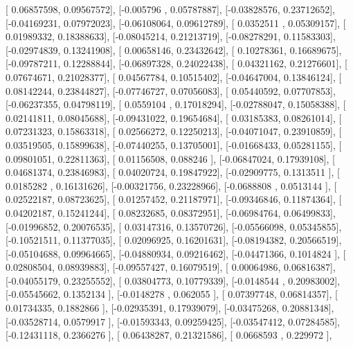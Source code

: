 \documentclass{article}
\begin{document}
       [ 0.06857598,  0.09567572],
       [-0.005796  ,  0.05787887],
       [-0.03828576,  0.23712652],
       [-0.04169231,  0.07972023],
       [-0.06108064,  0.09612789],
       [ 0.0352511 ,  0.05309157],
       [ 0.01989332,  0.18388633],
       [-0.08045214,  0.21213719],
       [-0.08278291,  0.11583303],
       [-0.02974839,  0.13241908],
       [ 0.00658146,  0.23432642],
       [ 0.10278361,  0.16689675],
       [-0.09787211,  0.12288844],
       [-0.06897328,  0.24022438],
       [ 0.04321162,  0.21276601],
       [ 0.07674671,  0.21028377],
       [ 0.04567784,  0.10515402],
       [-0.04647004,  0.13846124],
       [ 0.08142244,  0.23844827],
       [-0.07746727,  0.07056083],
       [ 0.05440592,  0.07707853],
       [-0.06237355,  0.04798119],
       [ 0.0559104 ,  0.17018294],
       [-0.02788047,  0.15058388],
       [ 0.02141811,  0.08045688],
       [-0.09431022,  0.19654684],
       [ 0.03185383,  0.08261014],
       [ 0.07231323,  0.15863318],
       [ 0.02566272,  0.12250213],
       [-0.04071047,  0.23910859],
       [ 0.03519505,  0.15899638],
       [-0.07440255,  0.13705001],
       [-0.01668433,  0.05281155],
       [ 0.09801051,  0.22811363],
       [ 0.01156508,  0.088246  ],
       [-0.06847024,  0.17939108],
       [ 0.04681374,  0.23846983],
       [ 0.04020724,  0.19847922],
       [-0.02909775,  0.1313511 ],
       [ 0.0185282 ,  0.16131626],
       [-0.00321756,  0.23228966],
       [-0.0688808 ,  0.0513144 ],
       [ 0.02522187,  0.08723625],
       [ 0.01257452,  0.21187971],
       [-0.09346846,  0.11874364],
       [ 0.04202187,  0.15241244],
       [ 0.08232685,  0.08372951],
       [-0.06984764,  0.06499833],
       [-0.01996852,  0.20076535],
       [ 0.03147316,  0.13570726],
       [-0.05566098,  0.05345855],
       [-0.10521511,  0.11377035],
       [ 0.02096925,  0.16201631],
       [-0.08194382,  0.20566519],
       [-0.05104688,  0.09964665],
       [-0.04880934,  0.09216462],
       [-0.04471366,  0.1014824 ],
       [ 0.02808504,  0.08939883],
       [-0.09557427,  0.16079519],
       [ 0.00064986,  0.06816387],
       [-0.04055179,  0.23255552],
       [ 0.03804773,  0.10779339],
       [-0.0148544 ,  0.20983002],
       [-0.05545662,  0.1352134 ],
       [-0.0148278 ,  0.062055  ],
       [ 0.07397748,  0.06814357],
       [ 0.01734335,  0.1882866 ],
       [-0.02935391,  0.17939079],
       [-0.03475268,  0.20881348],
       [-0.03528714,  0.0579917 ],
       [-0.01593343,  0.09259425],
       [-0.03547412,  0.07284585],
       [-0.12431118,  0.2366276 ],
       [ 0.06438287,  0.21321586],
       [ 0.0668593 ,  0.229972  ],
\end{document}
